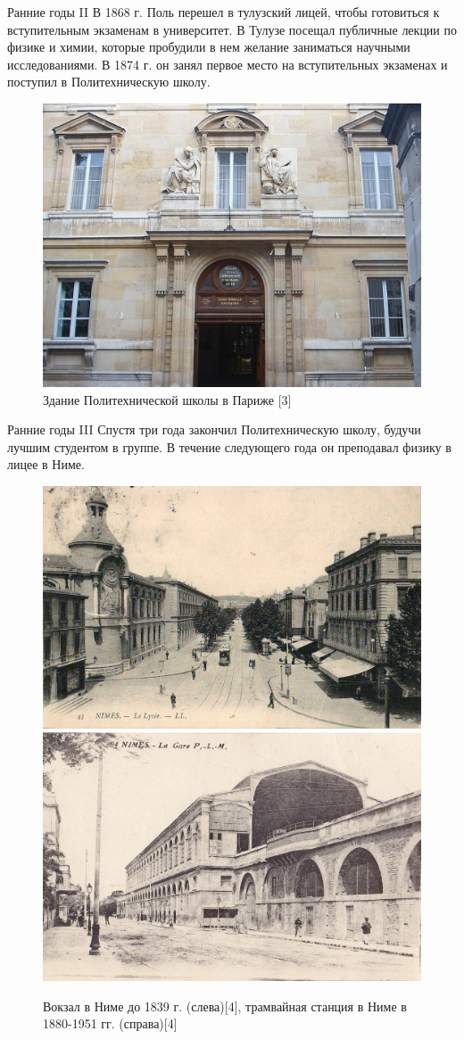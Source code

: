 \documentclass[hyperref={pdfpagelabel=false},usepdftitle=false,xcolor=dvipsnames]{beamer}
\begin{document}
\begin{frame}{Ранние годы II}
В 1868 г. Поль перешел в тулузский лицей, чтобы готовиться к вступительным экзаменам в университет. В Тулузе посещал публичные лекции по физике и химии, которые пробудили в нем желание заниматься научными исследованиями. В 1874 г. он занял первое место на вступительных экзаменах и поступил в Политехническую школу. 
\begin{figure}
	\includegraphics[width=0.48\linewidth]{pictures/ens1.jpg}
	\caption{\centering Здание Политехнической школы в Париже [3]}
		\end{figure}
\end{frame}

\begin{frame}{Ранние годы III}
	Спустя три года закончил Политехническую школу, будучи лучшим студентом в группе. В течение следующего года он преподавал физику в лицее в Ниме. 
	\begin{figure}
		\includegraphics[width=0.47\linewidth]{pictures/nimes.jpg}
		\hspace{0.2cm}
		\includegraphics[width=0.47\linewidth]{pictures/nimes2.jpg}
		\caption{\centering Вокзал в Ниме до 1839 г. (слева)[4], трамвайная станция в Ниме в 1880-1951 гг. (справа)[4]}
	\end{figure}
\end{frame}
\end{document}

